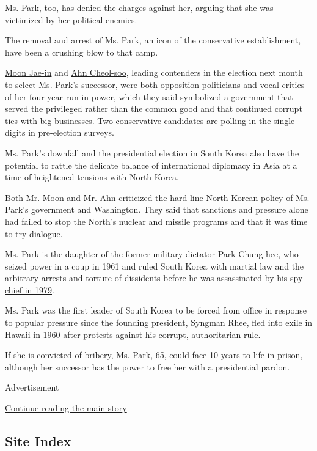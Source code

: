 Ms. Park, too, has denied the charges against her, arguing that she was
victimized by her political enemies.

The removal and arrest of Ms. Park, an icon of the conservative
establishment, have been a crushing blow to that camp.

\href{https://www.nytimes.com/2017/03/10/world/asia/south-korea-liberals-impeachment.html}{Moon
Jae-in} and
\href{https://www.nytimes.com/2017/04/14/world/asia/south-korea-election-ahn-cheol-soo.html}{Ahn
Cheol-soo}, leading contenders in the election next month to select Ms.
Park's successor, were both opposition politicians and vocal critics of
her four-year run in power, which they said symbolized a government that
served the privileged rather than the common good and that continued
corrupt ties with big businesses. Two conservative candidates are
polling in the single digits in pre-election surveys.

Ms. Park's downfall and the presidential election in South Korea also
have the potential to rattle the delicate balance of international
diplomacy in Asia at a time of heightened tensions with North Korea.

Both Mr. Moon and Mr. Ahn criticized the hard-line North Korean policy
of Ms. Park's government and Washington. They said that sanctions and
pressure alone had failed to stop the North's nuclear and missile
programs and that it was time to try dialogue.

Ms. Park is the daughter of the former military dictator Park Chung-hee,
who seized power in a coup in 1961 and ruled South Korea with martial
law and the arbitrary arrests and torture of dissidents before he was
\href{http://www.nytimes.com/1979/10/27/archives/president-park-is-slain-in-korea-by-intelligence-chief-seoul-says.html}{assassinated
by his spy chief in 1979}.

Ms. Park was the first leader of South Korea to be forced from office in
response to popular pressure since the founding president, Syngman Rhee,
fled into exile in Hawaii in 1960 after protests against his corrupt,
authoritarian rule.

If she is convicted of bribery, Ms. Park, 65, could face 10 years to
life in prison, although her successor has the power to free her with a
presidential pardon.

Advertisement

\protect\hyperlink{after-bottom}{Continue reading the main story}

\hypertarget{site-index}{%
\subsection{Site Index}\label{site-index}}

